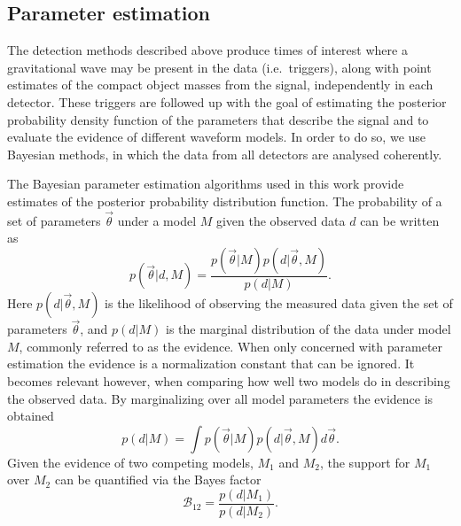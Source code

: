 \documentclass[12pt]{iopart}
\begin{document}
\subsection{Parameter estimation}
\label{ssec:PE_pipelines}

The detection methods described above produce times of interest where a
gravitational wave may be present in the data (i.e.\ triggers), along with point
estimates of the compact object masses from the signal, independently in each 
detector. These triggers are followed up with the goal of
estimating the posterior probability density function of the parameters
that describe the signal and to evaluate the evidence of different
waveform models. In order to do so, we use Bayesian methods, in which
the data from all detectors are analysed coherently.

The Bayesian parameter estimation
algorithms used in this work provide estimates of the posterior probability 
distribution function.
The probability of a set of parameters $\vec{\theta}$ under a model $M$ given
the observed data $d$ can be written as
\begin{equation}
    \label{posterior}
    p(\vec{\theta}|d,M) = \frac{p(\vec{\theta}|M)p(d|\vec{\theta},M)}{p(d|M)}.
\end{equation}
Here $p(d|\vec{\theta},M)$ is the likelihood of observing the measured data
given the set of parameters $\vec{\theta}$, and $p(d|M)$ is the marginal
distribution of the data under model $M$, commonly referred to as the evidence.
When only concerned with parameter estimation the evidence is a normalization
constant that can be ignored.  It becomes relevant however, when comparing how
well two models do in describing the observed data.  By marginalizing over all
model parameters the evidence is obtained
\begin{equation}
    \label{evidence}
    p(d|M) = \int p(\vec{\theta}|M)p(d|\vec{\theta},M) d\vec{\theta}.
\end{equation}
Given the evidence of two competing models, $M_1$ and $M_2$, the support for
$M_1$ over $M_2$ can be quantified via the Bayes factor
\begin{equation}
    \label{bayesFactor}
    \mathcal{B}_{12} = \frac{p(d|M_1)}{p(d|M_2)}.
\end{equation}
\end{document}
